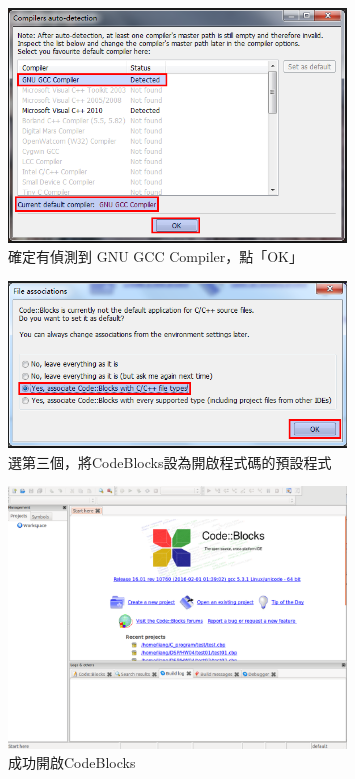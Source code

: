		\begin{figure}[H]
			\centering
			\includegraphics[width=0.8\textwidth]{fig/install_and_setting/install_011_setup08}
			\caption{確定有偵測到 GNU GCC Compiler，點「OK」}
		\end{figure}
		
		\begin{figure}[H]
			\centering
			\includegraphics[width=0.8\textwidth]{fig/install_and_setting/install_012_setup09}
			\caption{選第三個，將CodeBlocks設為開啟程式碼的預設程式}
		\end{figure}
		
		\begin{figure}[H]
			\centering
			\includegraphics[width=0.8\textwidth]{fig/install_and_setting/install_013_setup10}
			\caption{成功開啟CodeBlocks}
		\end{figure}
		
